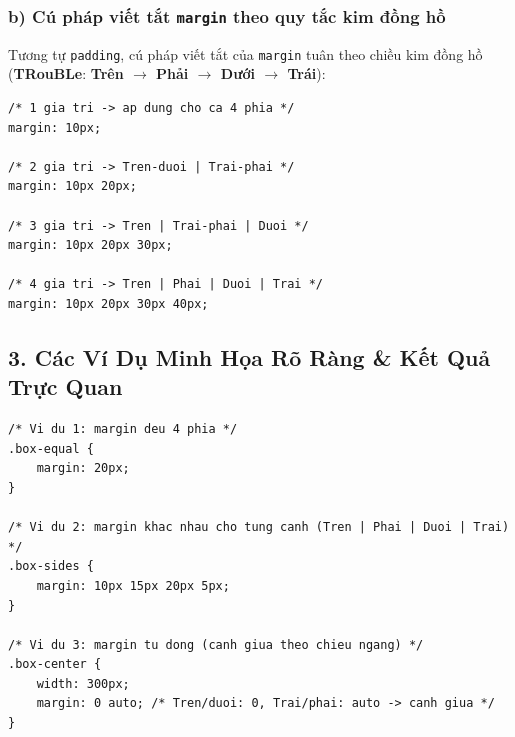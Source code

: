 \documentclass[11pt,oneside]{book}
\newcommand{\codeinline}[1]{\textcolor{accentOrange}{\texttt{#1}}}
\newcommand{\term}[1]{\textbf{\textcolor{primaryBlue}{#1}}}
\begin{document}
\subsubsection{b) Cú pháp viết tắt \codeinline{margin} theo quy tắc kim đồng hồ}

Tương tự \codeinline{padding}, cú pháp viết tắt của \codeinline{margin} tuân theo chiều kim đồng hồ (\term{TRouBLe}: \textbf{Trên $\rightarrow$ Phải $\rightarrow$ Dưới $\rightarrow$ Trái}):

\begin{codeWindow}
\begin{lstlisting}[language=CSS3]
/* 1 gia tri -> ap dung cho ca 4 phia */
margin: 10px;

/* 2 gia tri -> Tren-duoi | Trai-phai */
margin: 10px 20px;

/* 3 gia tri -> Tren | Trai-phai | Duoi */
margin: 10px 20px 30px;

/* 4 gia tri -> Tren | Phai | Duoi | Trai */
margin: 10px 20px 30px 40px;
\end{lstlisting}
\end{codeWindow}

\subsection{3. Các Ví Dụ Minh Họa Rõ Ràng \& Kết Quả Trực Quan}

\begin{codeWindow}
\begin{lstlisting}[language=CSS3]
/* Vi du 1: margin deu 4 phia */
.box-equal {
    margin: 20px;
}

/* Vi du 2: margin khac nhau cho tung canh (Tren | Phai | Duoi | Trai) */
.box-sides {
    margin: 10px 15px 20px 5px;
}

/* Vi du 3: margin tu dong (canh giua theo chieu ngang) */
.box-center {
    width: 300px;
    margin: 0 auto; /* Tren/duoi: 0, Trai/phai: auto -> canh giua */
}
\end{lstlisting}
\end{codeWindow}
\end{document}
